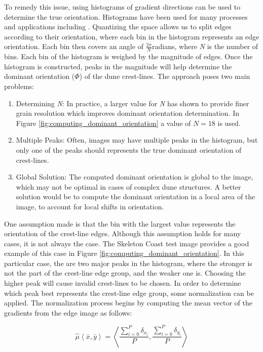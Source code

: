 To remedy this issue, using histograms of gradient directions can be used to determine the true orientation. Histograms have been used for many processes and applications including \cite{lowe_sift_paper, dalal_histogram_oriented_gradients_human_detection, hu_gradient_field_descriptor}. Quantizing the space allows us to split edges according to their orientation, where each bin in the histogram represents an edge orientation. Each bin then covers an angle of $\frac{2\pi}{N}$radians, where \emph{N} is the number of bins. Each bin of the histogram is weighed by the magnitude of edges. Once the histogram is constructed, peaks in the magnitude
will help determine the dominant orientation ($\varPhi$) of the dune
crest-lines. The approach poses two main problems:

\begin{enumerate}
	\item Determining \emph{N}: In practice, a larger value for \emph{N} has shown to provide finer grain resolution which improves dominant orientation determination. In Figure \ref{fig:computing_dominant_orientation} a value of $N=18$ is used.
	\item Multiple Peaks: Often, images may have multiple peaks
	in the histogram, but only one of the peaks should represents the
	true dominant orientation of crest-lines.
	\item Global Solution: The computed dominant orientation is global to the image, which may not be optimal in cases of complex dune structures. A better solution would be to compute the dominant orientation in a local area of the image, to account for local shifts in orientation.
\end{enumerate}

One assumption made is that the bin with the largest value represents the orientation of the crest-line edges. Although this assumption holds for many cases, it is not always the case. The Skeleton Coast test image provides a good example of this case in Figure \ref{fig:computing_dominant_orientation}. In this particular case, the are two major peaks in the histogram, where the stronger is not the part of the crest-line edge group, and the weaker one is. Choosing the higher peak will cause invalid crest-lines to be chosen. In order to determine which peak best represents the crest-line edge group, some normalization can be applied. The normalization process begins by computing the mean vector of the gradients from the edge image as follows:

\[
\hat{\mu}\left\langle \bar{x},\bar{y}\right\rangle =\left\langle \frac{\sum_{i=0}^{P}\delta_{x_{i}}}{P},\frac{\sum_{i=0}^{P}\delta_{y_{i}}}{P}\right\rangle 
\]


